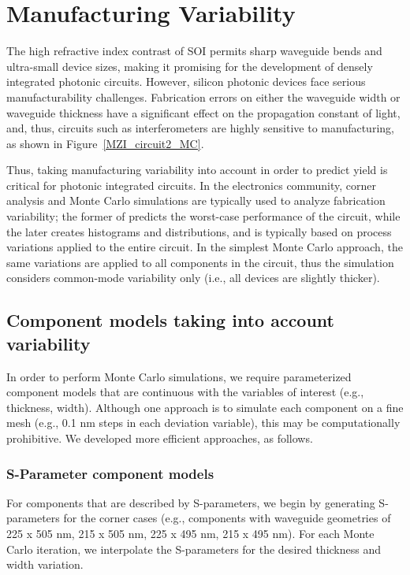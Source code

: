 \documentclass[journal]{spie}
\begin{document}
\section{Manufacturing Variability}
\label{sec:variability}
The high refractive index contrast of SOI permits sharp waveguide bends and ultra-small device sizes, making it promising for the development of densely integrated photonic circuits. However, silicon photonic devices face serious manufacturability challenges. Fabrication errors on either the waveguide width or waveguide thickness have a significant effect on the propagation constant of light, and, thus, circuits such as interferometers are highly sensitive to manufacturing, as shown in Figure~\ref{MZI_circuit2_MC}.

Thus, taking manufacturing variability into account in order to predict yield is critical for photonic integrated circuits. In the electronics community, corner analysis and Monte Carlo simulations are typically used to analyze fabrication variability; the former of predicts the worst-case performance of the circuit, while the later creates histograms and distributions, and is typically based on process variations applied to the entire circuit.  In the simplest Monte Carlo approach, the same variations are applied to all components in the circuit, thus the simulation considers common-mode variability only (i.e., all devices are slightly thicker).  

\subsection{Component models taking into account variability}
In order to perform Monte Carlo simulations, we require parameterized component models that are continuous with the variables of interest (e.g., thickness, width).  Although one approach is to simulate each component on a fine mesh (e.g., 0.1 nm steps in each deviation variable), this may be computationally prohibitive.  We developed more efficient approaches, as follows.

\subsubsection{S-Parameter component models}
For components that are described by S-parameters, we begin by generating S-parameters for the corner cases (e.g., components with waveguide geometries of 225 x 505 nm, 215 x 505 nm, 225 x 495 nm, 215 x 495 nm).  For each Monte Carlo iteration, we interpolate the S-parameters for the desired thickness and width variation.
\end{document}
